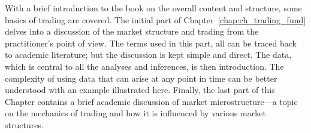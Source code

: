 
With a brief introduction to the book on the overall content and structure, some basics of trading are covered. The initial part of Chapter~\ref{chap:ch_trading_fund} delves into a discussion of the market structure and trading from the practitioner's point of view. The terms used in this part, all can be traced back to academic literature; but the discussion is kept simple and direct. The data, which is central to all the analyses and inferences, is then introduction. The complexity of using data that can arise at any point in time can be better understood with an example illustrated here. Finally, the last part of this Chapter contains a brief academic discussion of market microstructure---a topic on the mechanics of trading and how it is influenced by various market structures. 